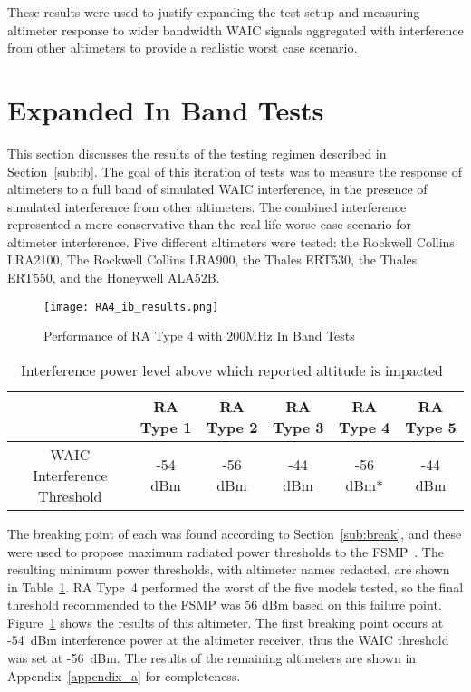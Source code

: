 These results were used to justify expanding the test setup and measuring altimeter response to wider bandwidth WAIC signals aggregated with interference from other altimeters to provide a realistic worst case scenario.

\section{Expanded In Band Tests}\label{sec:dvsg_ib_results}
This section discusses the results of the testing regimen described in Section~\ref{sub:ib}. The goal of this iteration of tests was to measure the response of altimeters to a full band of simulated WAIC interference, in the presence of simulated interference from other altimeters. The combined interference represented a more conservative than the real life worse case scenario for altimeter interference. Five different altimeters were tested: the Rockwell Collins LRA2100, The Rockwell Collins LRA900, the Thales ERT530, the Thales ERT550, and the Honeywell ALA52B.
 \begin{figure}[h!]
	\centering
	\texttt{[image: RA4\_ib\_results.png]}
	\caption{Performance of RA Type 4 with 200MHz In Band Tests}
	\label{fig:RA4}
\end{figure}

\begin{table}[]
\begin{tabular}{@{}cccccc@{}}
\toprule
                            & RA Type 1 & RA Type 2 & RA Type 3 & RA Type 4 & RA Type 5 \\ \midrule
WAIC Interference Threshold & -54 dBm   & -56 dBm   & -44 dBm   & -56 dBm*  & -44 dBm   \\ \bottomrule
\end{tabular}
\caption{Interference power level above which reported altitude is impacted~\cite{uwe_radio_2019}}
\label{tab:ib_thresholds_fsmp}
\end{table}

The breaking point of each was found according to Section~\ref{sub:break}, and these were used to propose maximum radiated power thresholds to the FSMP~\cite{uwe_radio_2019}. The resulting minimum power thresholds, with altimeter names redacted, are shown in Table~\ref{tab:ib_thresholds_fsmp}. RA Type~4 performed the worst of the five models tested, so the final threshold recommended to the FSMP was 56 dBm based on this failure point. Figure~\ref{fig:RA4} 
 shows the results of this altimeter. The first breaking point occurs at -54~dBm interference power at the altimeter receiver, thus the WAIC threshold was set at -56~dBm. The results of the remaining altimeters are shown in Appendix~\ref{appendix_a} for completeness. 

